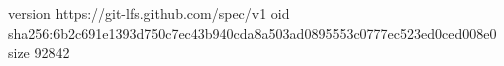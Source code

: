version https://git-lfs.github.com/spec/v1
oid sha256:6b2c691e1393d750c7ec43b940cda8a503ad0895553c0777ec523ed0ced008e0
size 92842
